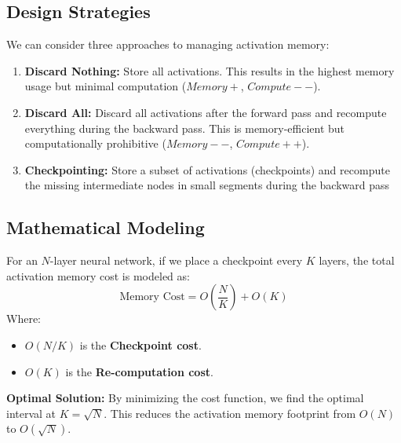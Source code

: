 \subsection{Design Strategies}
We can consider three approaches to managing activation memory:
\begin{enumerate}
    \item \textbf{Discard Nothing:} Store all activations. This results in the highest memory usage but minimal computation ($Memory+$, $Compute--$).
    \item \textbf{Discard All:} Discard all activations after the forward pass and recompute everything during the backward pass. This is memory-efficient but computationally prohibitive ($Memory--$, $Compute++$).
    \item \textbf{Checkpointing:} Store a subset of activations (checkpoints) and recompute the missing intermediate nodes in small segments during the backward pass
\end{enumerate}

\subsection{Mathematical Modeling}
For an $N$-layer neural network, if we place a checkpoint every $K$ layers, the total activation memory cost is modeled as:
\begin{equation}
    \text{Memory Cost} = O\left(\frac{N}{K}\right) + O(K)
\end{equation}
Where:
\begin{itemize}
    \item $O(N/K)$ is the \textbf{Checkpoint cost}.
    \item $O(K)$ is the \textbf{Re-computation cost}.
\end{itemize}

\textbf{Optimal Solution:} By minimizing the cost function, we find the optimal interval at $K = \sqrt{N}$. This reduces the activation memory footprint from $O(N)$ to $O(\sqrt{N})$.